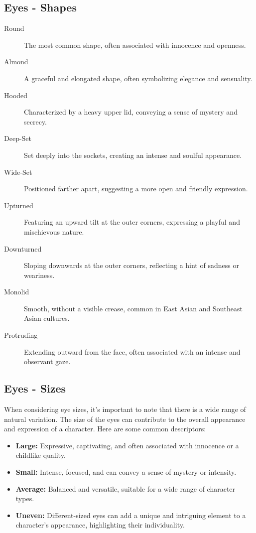 \documentclass[12pt]{book}  %
\begin{document}
\subsection{\textbf{Eyes - Shapes}}

\begin{description}
    \item[Round] The most common shape, often associated with innocence and openness.
    \item[Almond] A graceful and elongated shape, often symbolizing elegance and sensuality.
    \item[Hooded] Characterized by a heavy upper lid, conveying a sense of mystery and secrecy.
    \item[Deep-Set] Set deeply into the sockets, creating an intense and soulful appearance.
    \item[Wide-Set] Positioned farther apart, suggesting a more open and friendly expression.
    \item[Upturned] Featuring an upward tilt at the outer corners, expressing a playful and mischievous nature.
    \item[Downturned] Sloping downwards at the outer corners, reflecting a hint of sadness or weariness.
    \item[Monolid] Smooth, without a visible crease, common in East Asian and Southeast Asian cultures.
    \item[Protruding] Extending outward from the face, often associated with an intense and observant gaze.
\end{description}

\subsection{\textbf{Eyes - Sizes}}

When considering eye sizes, it's important to note that there is a wide range of natural variation. The size of the eyes can contribute to the overall appearance and expression of a character. Here are some common descriptors:

\begin{itemize}
    \item \textbf{Large:} Expressive, captivating, and often associated with innocence or a childlike quality.
    \item \textbf{Small:} Intense, focused, and can convey a sense of mystery or intensity.
    \item \textbf{Average:} Balanced and versatile, suitable for a wide range of character types.
    \item \textbf{Uneven:} Different-sized eyes can add a unique and intriguing element to a character's appearance, highlighting their individuality.
\end{itemize}
\end{document}
